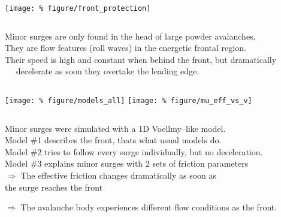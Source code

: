 \documentclass[unknownkeysallowed,usepdftitle=false]{beamer}
\newcommand{\secvariable}{nothing}
\newcommand{\mysection}[1]{\renewcommand{\secvariable}{#1}
}
\begin{document}
\mysection{minor}
\begin{frame}\label{\secvariable} %
\begin{center}
\texttt{[image: \%
figure/front\_protection]}
\end{center}
\vspace{-0.2cm}
\begin{columns}
\begin{column}[t]{1.1\textwidth}
Minor surges are only found in the head of large powder avalanches.\\
They are flow features (roll waves) in the energetic
frontal region.\\
Their speed is high and constant when behind the front, but dramatically \\
$\quad$ decelerate as soon they overtake the leading edge.

\end{column}
\end{columns}

\end{frame}

\mysection{friction}
\begin{frame}\label{\secvariable}
\hspace{-0.6cm}
\texttt{[image: \%
figure/models\_all]}
\texttt{[image: \%
figure/mu\_eff\_vs\_v]}

\begin{columns}
\begin{column}[t]{1.1\textwidth}
Minor surges were simulated with a 1D Voellmy--like model.\\
Model \#1 describes the front, thats what usual models do.\\
Model \#2 tries to follow every surge individually, but no deceleration.\\
Model \#3 explains minor surges with 2 sets of friction
parameters\\
\vspace{0.2cm}
$\Rightarrow$ The effective friction changes dramatically as soon as\\
\raggedleft the surge reaches the front\\
\raggedright $\Rightarrow$ The avalanche body experiences different flow
conditions as the front.
\end{column}
\end{columns}

\end{frame}
\end{document}
